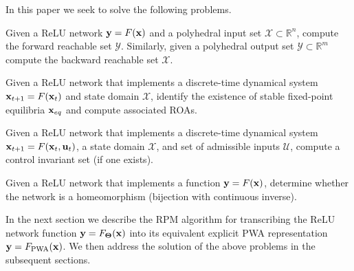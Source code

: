 
In this paper we seek to solve the following problems.
\begin{problem}
Given a ReLU network $\mathbf{y} = F(\mathbf{x})$ and a polyhedral input set $\mathcal{X} \subset \mathbb{R}^n$, compute the forward reachable set $\mathcal{Y}$. Similarly, given a polyhedral output set $\mathcal{Y}\subset \mathbb{R}^m$ compute the backward reachable set $\mathcal{X}$.
\end{problem}
\begin{problem}
Given a ReLU network that implements a discrete-time dynamical system $\mathbf{x}_{t+1} = F(\mathbf{x}_t)$ and state domain $\mathcal{X}$, identify the existence of stable fixed-point equilibria $\mathbf{x}_{eq}$ and compute associated ROAs.
\end{problem}
\begin{problem}
Given a ReLU network that implements a discrete-time dynamical system $\mathbf{x}_{t+1} = F(\mathbf{x}_t, \mathbf{u}_t)$, a state domain $\mathcal{X}$, and set of admissible inputs $\mathcal{U}$, compute a control invariant set (if one exists).
\end{problem}
\begin{problem}
Given a ReLU network that implements a function $\mathbf{y} = F(\mathbf{x})$, determine whether the network is a homeomorphism (bijection with continuous inverse).
\end{problem}
In the next section we describe the RPM algorithm for transcribing the ReLU network function $\mathbf{y} = F_{\mathbf{\Theta}}(\mathbf{x})$ into its equivalent explicit PWA representation $\mathbf{y} = F_{\text{PWA}}(\mathbf{x})$. We then address the solution of the above problems in the subsequent sections.



